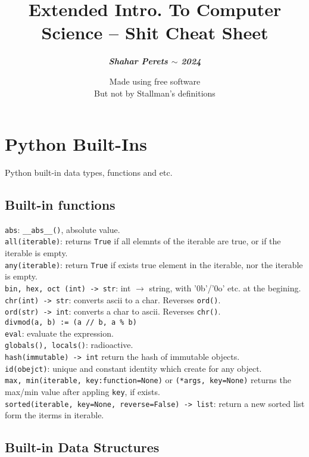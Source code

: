 \documentclass[]{article}
\title{Extended Intro. To Computer Science -- Shit Cheat Sheet}
\author{\textbf{\textit{Shahar Perets $\sim$ 2024}}}
\date{\normalsize Made using free software \\ But not by Stallman's definitions}
\newcommand\fortitle[1] {\Large #1 \normalsize}
\begin{document}
	\setlength{\abovedisplayskip}{0pt}
	\setlength{\belowdisplayskip}{2pt}
	\setlength{\abovedisplayshortskip}{0pt}
	\setlength{\belowdisplayshortskip}{0pt}
	\section{\fortitle{Python Built-Ins}}Python built-in data types, functions and etc. 
	\begin{multicols}{2}
		
		\subsection{Built-in functions}
		
		\texttt{abs}: \texttt{\_\_abs\_\_()}, absolute value. \\
		\texttt{all(iterable)}: returns \texttt{True} if all elemnts of the iterable are true, or if the iterable is empty. \\
		\texttt{any(iterable)}: return \texttt{True} if exists true element in the iterable, nor the iterable is empty. \\
		\texttt{bin, hex, oct (int) -> str}: int $ \rightarrow $ string, with '0b'/'0o' etc. at the begining. \\
		\texttt{chr(int) -> str}: converts ascii to a char. Reverses \texttt{ord()}. \\
		\texttt{ord(str) -> int}: converts a char to ascii. Reverses \texttt{chr()}. \\
		\texttt{divmod(a, b) := (a // b, a \% b)} \\
		\texttt{eval}: evaluate the expression. \\
		\texttt{globals(), locals()}: radioactive. \\
		\texttt{hash(immutable) -> int} return the hash of immutable objects. \\
		\texttt{id(obejct)}: unique and constant identity which create for any object. \\
		\texttt{max, min(iterable, key:function=None)} or \texttt{(*args, key=None)} returns the max/min value after appling \texttt{key}, if exists. \\
		\texttt{sorted(iterable, key=None, reverse=False) -> list}: return a new sorted list form the iterms in iterable. 
		
		\subsection{Built-in Data Structures}

\end{multicols}
\end{document}
